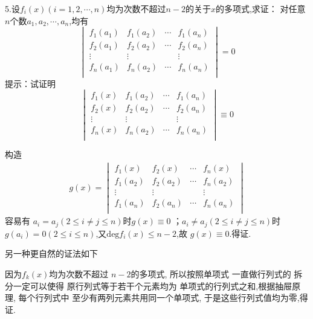 5.设$f_i\left(x\right)\left(
	i=1,2,\cdots,n
\right)$均为次数不超过$n-2$的关于$x$的多项式,求证：
对任意$n$个数$a_1,a_2,\cdots,a_n$,均有
\[
\begin{vmatrix}
	f_1\left(a_1\right) & 
	f_1\left(a_2\right) & \cdots &
	f_1\left(a_n\right)\\
	f_2\left(a_1\right) & 
	f_2\left(a_2\right) & \cdots &
	f_2\left(a_n\right)\\
	\vdots&\vdots&&\vdots\\
	f_n\left(a_1\right) & 
	f_n\left(a_2\right) & \cdots &
	f_n\left(a_n\right)\\
\end{vmatrix}
=0
\]
提示：试证明
\[
\begin{vmatrix}
	f_1\left(x\right) & 
	f_1\left(a_2\right) & \cdots &
	f_1\left(a_n\right)\\
	f_2\left(x\right) & 
	f_2\left(a_2\right) & \cdots &
	f_2\left(a_n\right)\\
	\vdots&\vdots&&\vdots\\
	f_n\left(x\right) & 
	f_n\left(a_2\right) & \cdots &
	f_n\left(a_n\right)\\
\end{vmatrix}
\equiv 0
\]
\begin{Proof}
	构造
	\begin{align*}
		g\left(x\right)
		=\begin{vmatrix}
			f_1\left(x\right) & 
			f_2\left(x\right) & \cdots &
			f_n\left(x\right)\\
			f_1\left(a_2\right) & 
			f_2\left(a_2\right) & \cdots &
			f_n\left(a_2\right)\\
			\vdots&\vdots&&\vdots\\
			f_1\left(a_n\right) & 
			f_2\left(a_n\right) & \cdots &
			f_n\left(a_n\right)\\
		\end{vmatrix}
	\end{align*}
	容易有
	$a_i=a_j\left(2\leqslant i\neq j\leqslant 
	n\right)$时$g\left(x\right)\equiv 0$
	；$a_i\neq a_j\left(2\leqslant i\neq j\leqslant 
	n\right)$时$g\left(a_i\right)
	=0\left(2\leqslant i
	\leqslant n\right)$,又$\mathrm{deg}f_i\left(
		x
	\right)\leqslant n-2$,故
	$g\left(x\right)\equiv 0$.得证.
	\qedhere
\end{Proof}
另一种更自然的证法如下
\begin{Proof}
	因为$f_k\left(x\right)$均为次数不超过
	$n-2$的多项式,
	所以按照单项式
	一直做行列式的
	拆分一定可以使得
	原行列式等于若干个元素均为
	单项式的行列式之和,根据抽屉原理,
	每个行列式中
	至少有两列元素共用同一个单项式,
	于是这些行列式值均为零,得证.
	\qedhere
\end{Proof}


